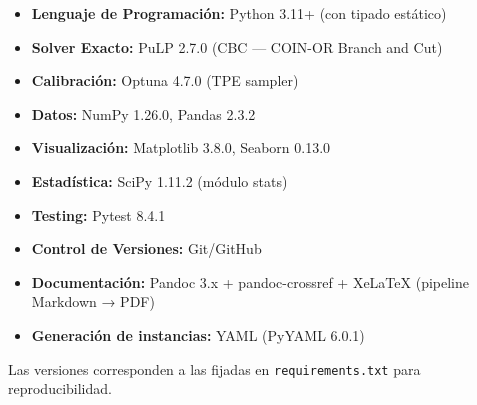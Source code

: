 \documentclass[
  spanish,
  12pt,
]{article}
\providecommand{\tightlist}{%
  \setlength{\itemsep}{0pt}\setlength{\parskip}{0pt}}
\begin{document}
\begin{itemize}
\tightlist
\item
  \textbf{Lenguaje de Programación:} Python 3.11+ (con tipado estático)
\item
  \textbf{Solver Exacto:} PuLP 2.7.0 (CBC --- COIN-OR Branch and Cut)
\item
  \textbf{Calibración:} Optuna 4.7.0 (TPE sampler)
\item
  \textbf{Datos:} NumPy 1.26.0, Pandas 2.3.2
\item
  \textbf{Visualización:} Matplotlib 3.8.0, Seaborn 0.13.0
\item
  \textbf{Estadística:} SciPy 1.11.2 (módulo stats)
\item
  \textbf{Testing:} Pytest 8.4.1
\item
  \textbf{Control de Versiones:} Git/GitHub
\item
  \textbf{Documentación:} Pandoc 3.x + pandoc-crossref + XeLaTeX
  (pipeline Markdown → PDF)
\item
  \textbf{Generación de instancias:} YAML (PyYAML 6.0.1)
\end{itemize}

Las versiones corresponden a las fijadas en \texttt{requirements.txt}
para reproducibilidad.
\end{document}
